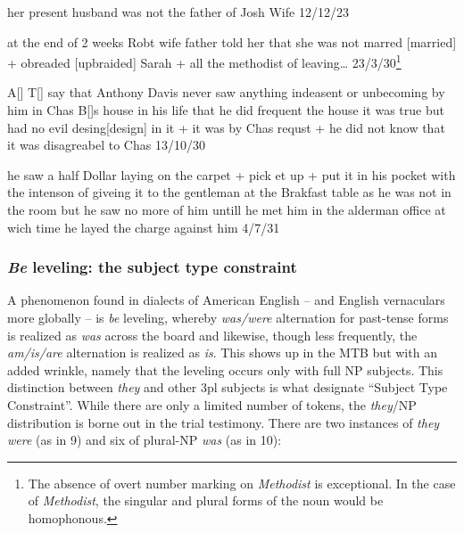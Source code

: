 \documentclass[output=paper,colorlinks,citecolor=brown]{langscibook}
\begin{document}
\ea%
    \label{ex:singler:5}
     
    

          her present husband was not the father of Josh Wife  12/12/23
\z

\ea%
    \label{ex:singler:6}
     
    

          at the end of 2 weeks Robt wife father told her that she was not marred [married] + obreaded [upbraided] Sarah + all the methodist  of leaving… 23/3/30\footnote{{The absence of overt number marking on} {\textit{Methodist} }{is exceptional. In the case of} {\textit{Methodist}}{, the singular and plural forms of the noun would be homophonous.}}
          
\z       
          
\ea%
    \label{ex:singler:7}
  
          A[] T[] say that Anthony Davis never saw anything indeasent or unbecoming by him in Chas B[]s house in his life that he did frequent the house it was true but had no evil desing[design] in it + it was by Chas requst + he did not know that it was disagreabel to Chas 13/10/30
 \z
 
\ea%
    \label{ex:singler:8}
     
    

          he saw a half Dollar laying on the carpet + pick et up + put it in his pocket with the intenson of giveing it to the gentleman at the Brakfast table as he was not in the room but he saw no more of him untill he met him in the alderman office at wich time he layed the charge against him 4/7/31
\z

\subsubsection{\textit{Be} leveling: the subject type constraint}
A phenomenon found in dialects of American English -- and English vernaculars more globally -- is \textit{be} leveling, whereby \textit{was/were} alternation for past-tense forms is realized as \textit{was} across the board and likewise, though less frequently, the \textit{am/is/are} alternation is realized as \textit{is}. This shows up in the MTB but with an added wrinkle, namely that the leveling occurs only with full NP subjects.  This distinction between \textit{they} and other 3pl subjects is what \citet{MontgomeryDeMarse1993} designate “Subject Type Constraint”. While there are only a limited number of tokens, the \textit{they}/NP distribution is borne out in the trial testimony.  There are two instances of \textit{they were} (as in 9) and six of plural-NP \textit{was} (as in 10):
\end{document}
